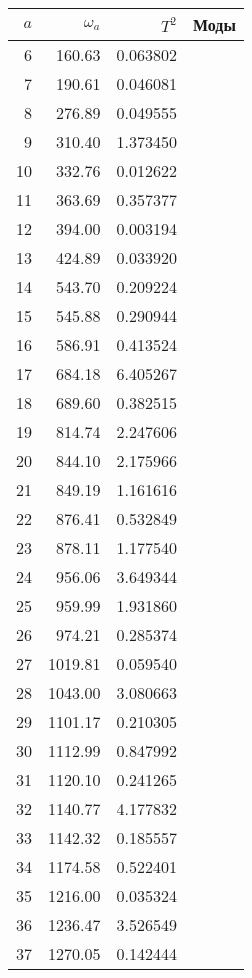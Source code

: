 \tiny
\begin{tabular}{r|rr|l}
  \toprule
  $a$ &  $\omega_a$ & $T^2$ & Моды \\
  \midrule
 6 &      160.63  &  0.063802  & \\
 7 &      190.61  &  0.046081  & \\
 8 &      276.89  &  0.049555  & \\
 9 &      310.40  &  1.373450  & \\
10 &      332.76  &  0.012622  & \\
11 &      363.69  &  0.357377  & \\
12 &      394.00  &  0.003194  & \\
13 &      424.89  &  0.033920  & \\
14 &      543.70  &  0.209224  & \\
15 &      545.88  &  0.290944  & \\
16 &      586.91  &  0.413524  & \\
17 &      684.18  &  6.405267  & \\
18 &      689.60  &  0.382515  & \\
19 &      814.74  &  2.247606  & \\
20 &      844.10  &  2.175966  & \\
21 &      849.19  &  1.161616  & \\
22 &      876.41  &  0.532849  & \\
23 &      878.11  &  1.177540  & \\
24 &      956.06  &  3.649344  & \\
25 &      959.99  &  1.931860  & \\
26 &      974.21  &  0.285374  & \\
27 &     1019.81  &  0.059540  & \\
28 &     1043.00  &  3.080663  & \\
29 &     1101.17  &  0.210305  & \\
30 &     1112.99  &  0.847992  & \\
31 &     1120.10  &  0.241265  & \\
32 &     1140.77  &  4.177832  & \\
33 &     1142.32  &  0.185557  & \\
34 &     1174.58  &  0.522401  & \\
35 &     1216.00  &  0.035324  & \\
36 &     1236.47  &  3.526549  & \\
37 &     1270.05  &  0.142444  & \\

\end{tabular}
